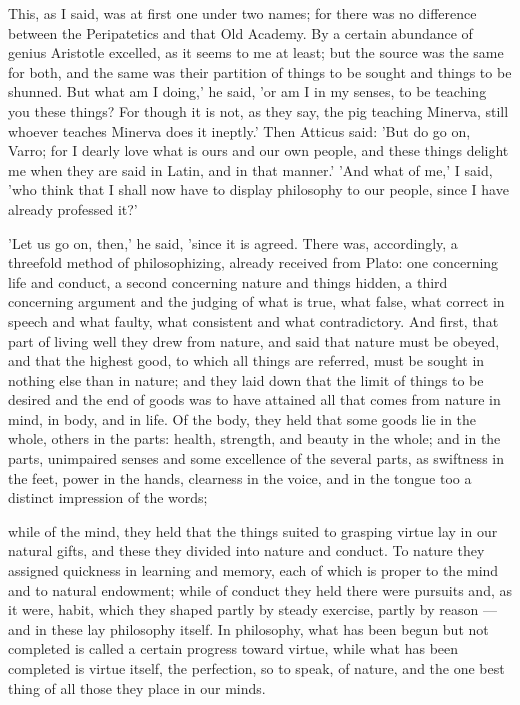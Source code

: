  This, as I said, was at first one under two names; for there was no difference between the Peripatetics and that Old Academy. By a certain abundance of genius Aristotle excelled, as it seems to me at least; but the source was the same for both, and the same was their partition of things to be sought and things to be shunned. But what am I doing,' he said, 'or am I in my senses, to be teaching you these things? For though it is not, as they say, the pig teaching Minerva, still whoever teaches Minerva does it ineptly.' Then Atticus said: 'But do go on, Varro; for I dearly love what is ours and our own people, and these things delight me when they are said in Latin, and in that manner.' 'And what of me,' I said, 'who think that I shall now have to display philosophy to our people, since I have already professed it?'

 'Let us go on, then,' he said, 'since it is agreed. There was, accordingly, a threefold method of philosophizing, already received from Plato: one concerning life and conduct, a second concerning nature and things hidden, a third concerning argument and the judging of what is true, what false, what correct in speech and what faulty, what consistent and what contradictory. And first, that part of living well they drew from nature, and said that nature must be obeyed, and that the highest good, to which all things are referred, must be sought in nothing else than in nature; and they laid down that the limit of things to be desired and the end of goods was to have attained all that comes from nature in mind, in body, and in life. Of the body, they held that some goods lie in the whole, others in the parts: health, strength, and beauty in the whole; and in the parts, unimpaired senses and some excellence of the several parts, as swiftness in the feet, power in the hands, clearness in the voice, and in the tongue too a distinct impression of the words;

 while of the mind, they held that the things suited to grasping virtue lay in our natural gifts, and these they divided into nature and conduct. To nature they assigned quickness in learning and memory, each of which is proper to the mind and to natural endowment; while of conduct they held there were pursuits and, as it were, habit, which they shaped partly by steady exercise, partly by reason — and in these lay philosophy itself. In philosophy, what has been begun but not completed is called a certain progress toward virtue, while what has been completed is virtue itself, the perfection, so to speak, of nature, and the one best thing of all those they place in our minds.

